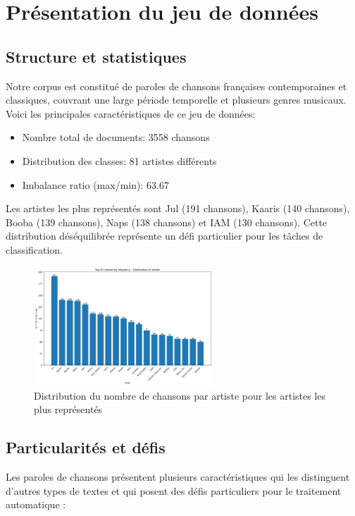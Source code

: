 \documentclass[a4paper,11pt]{article}
\begin{document}
\section{Présentation du jeu de données}
\label{sec:dataset}

\subsection{Structure et statistiques}
Notre corpus est constitué de paroles de chansons françaises contemporaines et classiques, couvrant une large période temporelle et plusieurs genres musicaux. Voici les principales caractéristiques de ce jeu de données:

\begin{itemize}
    \item Nombre total de documents: 3558 chansons
    \item Distribution des classes: 81 artistes différents
    \item Imbalance ratio (max/min): 63.67
\end{itemize}

Les artistes les plus représentés sont Jul (191 chansons), Kaaris (140 chansons), Booba (139 chansons), Naps (138 chansons) et IAM (130 chansons). Cette distribution déséquilibrée représente un défi particulier pour les tâches de classification.

\begin{figure}[ht]
    \centering
    \includegraphics[width=0.6\textwidth]{dataset_analysis.png}
    \caption{Distribution du nombre de chansons par artiste pour les artistes les plus représentés}
    \label{fig:artist-distribution}
\end{figure}

\subsection{Particularités et défis}
Les paroles de chansons présentent plusieurs caractéristiques qui les distinguent d'autres types de textes et qui posent des défis particuliers pour le traitement automatique :
\end{document}
